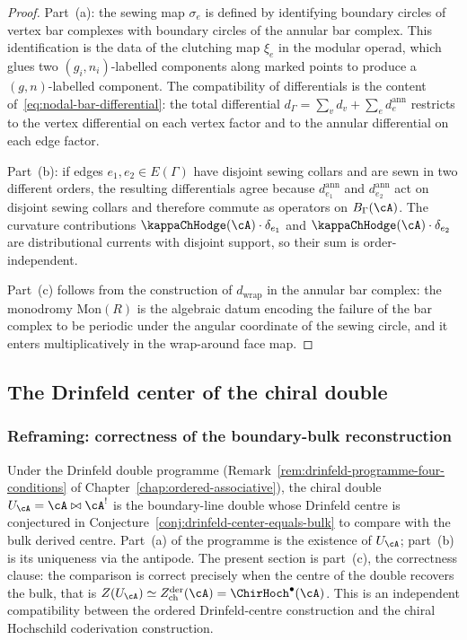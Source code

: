 \begin{proof}
Part~(a): the sewing map $\sigma_e$ is defined by identifying
boundary circles of vertex bar complexes with boundary circles
of the annular bar complex. This identification is the data of
the clutching map $\xi_e$ in the modular operad, which glues
two $(g_i,n_i)$-labelled components along marked points to produce
a $(g,n)$-labelled component. The compatibility of differentials
is the content of~\eqref{eq:nodal-bar-differential}: the total
differential $d_\Gamma = \sum_v d_v + \sum_e d^{\mathrm{ann}}_e$
restricts to the vertex differential on each vertex factor and
to the annular differential on each edge factor.

Part~(b): if edges $e_1,e_2\in E(\Gamma)$ have disjoint sewing
collars and are sewn in two different orders, the resulting
differentials agree because
$d^{\mathrm{ann}}_{e_1}$ and $d^{\mathrm{ann}}_{e_2}$ act on
disjoint sewing collars and therefore commute as operators
on $B_\Gamma(\cA)$. The curvature contributions
$\kappaChHodge(\cA)\cdot\delta_{e_1}$ and
$\kappaChHodge(\cA)\cdot\delta_{e_2}$ are distributional currents
with disjoint support, so their sum is order-independent.

Part~(c) follows from the construction of
$d_{\mathrm{wrap}}$ in the annular bar complex: the monodromy
$\mathrm{Mon}(R)$ is the algebraic datum encoding the failure
of the bar complex to be periodic under the angular coordinate
of the sewing circle, and it enters multiplicatively in the
wrap-around face map.
\end{proof}

\subsection{The Drinfeld center of the chiral double}
\label{subsec:drinfeld-center-chiral-double}

\subsubsection*{Reframing: correctness of the boundary-bulk reconstruction}

Under the Drinfeld double programme
(Remark~\ref{rem:drinfeld-programme-four-conditions} of
Chapter~\ref{chap:ordered-associative}), the chiral double
$U_\cA = \cA \bowtie \cA^!$ is the boundary-line double whose
Drinfeld centre is conjectured in
Conjecture~\ref{conj:drinfeld-center-equals-bulk} to compare with the
bulk derived centre.
Part~(a) of the programme is
the existence of $U_\cA$; part~(b) is its uniqueness via the
antipode. The present section is part~(c), the correctness
clause: the comparison is correct precisely when the centre of the
double recovers the bulk, that is
$Z(U_\cA) \simeq Z^{\mathrm{der}}_{\mathrm{ch}}(\cA) =
\ChirHoch^\bullet(\cA)$. This is an independent compatibility between
the ordered Drinfeld-centre construction and the chiral Hochschild
coderivation construction.

